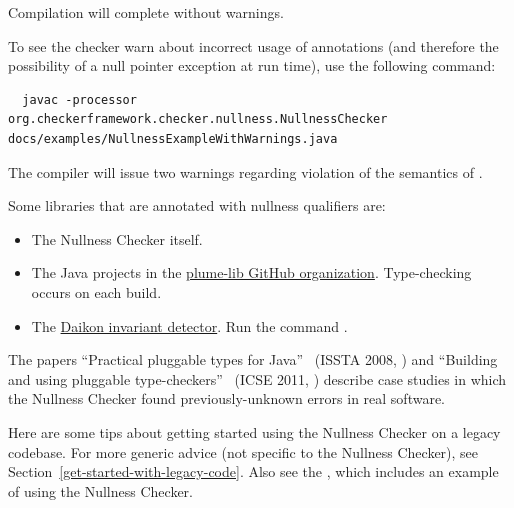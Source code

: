 \noindent
Compilation will complete without warnings.

To see the checker warn about incorrect usage of annotations (and therefore the
possibility of a null pointer exception at run time), use the following command:

\begin{mysmall}
\begin{Verbatim}
  javac -processor org.checkerframework.checker.nullness.NullnessChecker docs/examples/NullnessExampleWithWarnings.java
\end{Verbatim}
\end{mysmall}


\noindent
The compiler will issue two warnings regarding violation of the semantics of
.



Some libraries that are annotated with nullness qualifiers are:

\begin{itemize}
\item
The Nullness Checker itself.

\item
The Java projects in the \href{https://github.com/plume-lib/}
{plume-lib GitHub organization}.
Type-checking occurs on each build.

\item
The
\href{https://plse.cs.washington.edu/daikon/}{Daikon invariant detector}.
Run the command .

\end{itemize}



The papers ``Practical pluggable types for Java''~\cite{PapiACPE2008}
(ISSTA 2008,
)
and ``Building and using pluggable type-checkers''~\cite{DietlDEMS2011}
(ICSE 2011,
)
describe case studies in which the Nullness Checker found
previously-unknown errors in real software.



Here are some tips about getting started using the Nullness Checker on a
legacy codebase.  For more generic advice (not specific to the Nullness
Checker), see Section~\ref{get-started-with-legacy-code}.  Also see the
, which includes an example of using the Nullness Checker.

